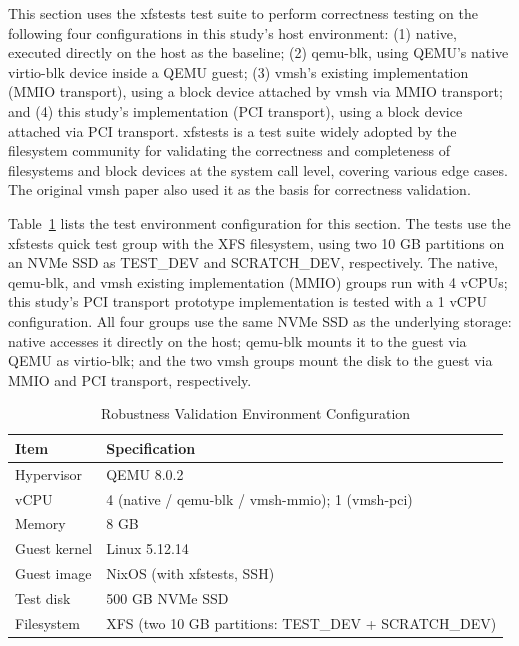 \begin{ZhChapter}
This section uses the xfstests test suite to perform correctness testing on the following four configurations in this study's host environment: (1) native, executed directly on the host as the baseline; (2) qemu-blk, using QEMU's native virtio-blk device inside a QEMU guest; (3) vmsh's existing implementation (MMIO transport), using a block device attached by vmsh via MMIO transport; and (4) this study's implementation (PCI transport), using a block device attached via PCI transport. xfstests is a test suite widely adopted by the filesystem community for validating the correctness and completeness of filesystems and block devices at the system call level, covering various edge cases. The original vmsh paper also used it as the basis for correctness validation.

Table~\ref{tab:robust-test-env} lists the test environment configuration for this section. The tests use the xfstests quick test group with the XFS filesystem, using two 10 GB partitions on an NVMe SSD as TEST\_DEV and SCRATCH\_DEV, respectively. The native, qemu-blk, and vmsh existing implementation (MMIO) groups run with 4 vCPUs; this study's PCI transport prototype implementation is tested with a 1 vCPU configuration. All four groups use the same NVMe SSD as the underlying storage: native accesses it directly on the host; qemu-blk mounts it to the guest via QEMU as virtio-blk; and the two vmsh groups mount the disk to the guest via MMIO and PCI transport, respectively.

\begin{table}[htbp]
    \centering
    \caption{Robustness Validation Environment Configuration}
    \label{tab:robust-test-env}
    \renewcommand\arraystretch{1.5}{
        \begin{tabular}{| l | l |}
        \hline
        Item & Specification \\
        \hline
        Hypervisor & QEMU 8.0.2 \\
        \hline
        vCPU & 4 (native / qemu-blk / vmsh-mmio); 1 (vmsh-pci) \\
        \hline
        Memory & 8 GB \\
        \hline
        Guest kernel & Linux 5.12.14 \\
        \hline
        Guest image & NixOS (with xfstests, SSH) \\
        \hline
        Test disk & 500 GB NVMe SSD \\
        \hline
        Filesystem & XFS (two 10 GB partitions: TEST\_DEV + SCRATCH\_DEV) \\
        \hline
        \end{tabular}
    }
\end{table}
\newpage


\end{ZhChapter}
